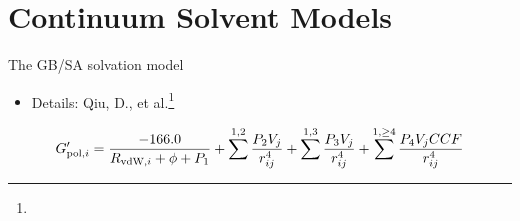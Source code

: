 \documentclass[10pt]{beamer}
\begin{document}
\section{Continuum Solvent Models}


\begin{frame}[t]{The GB/SA solvation model}

\begin{itemize}
    \item Details: Qiu, D., et al.\footnote{}
\end{itemize}

\begin{equation*}
G^\prime_{\textnormal{pol},i} = 
\frac{-166.0}{R_{\textnormal{vdW},i}+\phi+P_1} + 
\sum^{1,2}\frac{P_2V_j}{r^4_{ij}} + 
\sum^{1,3}\frac{P_3V_j}{r^4_{ij}} + 
\sum^{1,\ge 4}\frac{P_4V_jCCF}{r^4_{ij}}
\end{equation*}



\end{frame}
\end{document}
